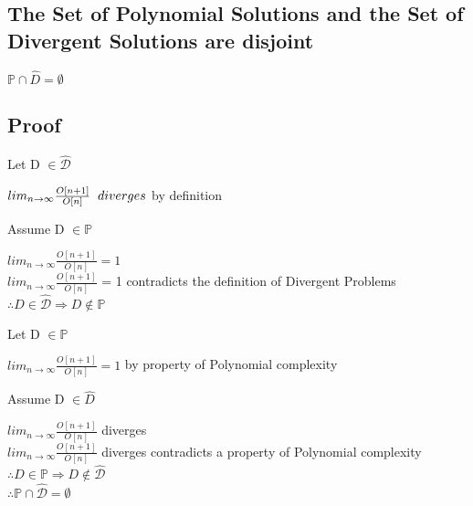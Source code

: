 \documentclass[11pt]{article}
\begin{document}
\subsection{The Set of Polynomial Solutions and the Set of Divergent Solutions are disjoint}
\begin{center}
\vspace{2mm}
$
\mathbb{P} \cap \hat{D} = \emptyset
$
\end{center}

\subsection{Proof}
Let D $\in \hat{\mathcal{D}}$
\begin{center}
$
lim_{n \rightarrow \infty} \frac{O[n+1]}{O[n]} \hspace{2mm} diverges$ by definition
\end{center}
\vspace{4mm}
Assume D $\in \mathbb{P}$
\begin{center}
$
lim_{n \rightarrow \infty} \frac{O[n+1]}{O[n]} = 1
$
\\ \vspace{2mm}
$
 lim_{n \rightarrow \infty} \frac{O[n+1]}{O[n]}$ = 1 contradicts the definition of Divergent Problems
\\ \vspace{2mm}
$
\therefore D \in \hat{\mathcal{D}} \Rightarrow D \not \in \mathbb{P}
$
\end{center}
\vspace{12mm}
Let D $\in \mathbb{P}$
\begin{center}
$
lim_{n \rightarrow \infty} \frac{O[n+1]}{O[n]} = 1$ by property of Polynomial complexity
\end{center}
\vspace{4mm}
Assume D $\in \hat{D}$
\begin{center}
$
lim_{n \rightarrow \infty} \frac{O[n+1]}{O[n]}$ diverges
\\ \vspace{2mm}
$
 lim_{n \rightarrow \infty} \frac{O[n+1]}{O[n]}$ diverges contradicts a property of Polynomial complexity
\\ \vspace{2mm}
$
\therefore D \in \mathbb{P} \Rightarrow D \not \in \hat{\mathcal{D}}
$
\\ \vspace{2mm}
$
\therefore \mathbb{P} \cap \hat{\mathcal{D}} = \emptyset
$
\end{center}
\end{document}
